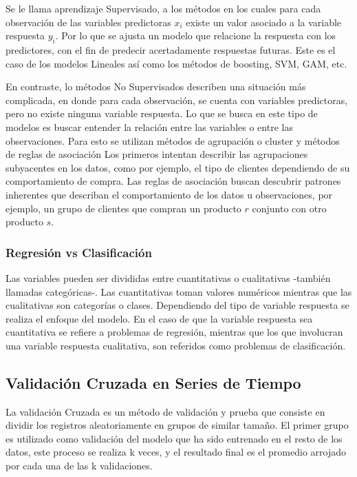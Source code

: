 \documentclass[a4paper,12pt]{Latex/Classes/PhDthesisPSnPDF}
\begin{document}
Se le llama aprendizaje Supervisado, a los métodos en los cuales para cada observación de las variables predictoras $x_{i}$ existe un valor asociado a la variable respuesta $y_{i}$. Por lo que se ajusta un modelo que relacione la respuesta con los predictores, con el fin de predecir acertadamente respuestas futuras. Este es el caso de los modelos Lineales así como los métodos de boosting, SVM, GAM, etc. 

En contraste, lo métodos No Supervisados describen una situación más complicada, en donde para cada observación, se cuenta con variables predictoras, pero no existe ninguna variable respuesta. Lo que se busca en este tipo de modelos es buscar entender la relación entre las variables o entre las observaciones. Para esto se utilizan métodos de agrupación o cluster y métodos de reglas de asociación Los primeros intentan describir las agrupaciones subyacentes en los datos, como por ejemplo, el tipo de clientes dependiendo de su comportamiento de compra. Las reglas de asociación buscan descubrir patrones inherentes que describan el comportamiento de los datos u observaciones, por ejemplo, un grupo de clientes que compran un producto $r$ conjunto con otro producto $s$.

\subsubsection{Regresión vs Clasificación}

Las variables pueden ser divididas entre cuantitativas o cualitativas -también llamadas categóricas-. Las cuantitativas toman valores numéricos mientras que las cualitativas son categorías o clases. Dependiendo del tipo de variable respuesta se realiza el enfoque del modelo. En el caso de que la variable respuesta sea cuantitativa se refiere a problemas de regresión, mientras que los que involucran una variable respuesta cualitativa, son referidos como problemas de clasificación.


\subsection{Validación Cruzada en Series de Tiempo}

La validación Cruzada es un método de validación y prueba que consiste en dividir los registros aleatoriamente en grupos de similar tamaño. El primer grupo es utilizado como validación del modelo que ha sido entrenado en el resto de los datos, este proceso se realiza k veces, y el resultado final es el promedio arrojado por cada una de las k validaciones.
\end{document}
